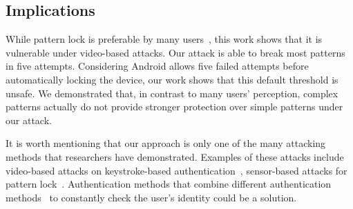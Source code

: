 

\subsection{Implications}
While pattern lock is preferable by many users~\cite{androidstudy}, this     work shows
that it is vulnerable under video-based attacks. Our attack
is able to break most patterns in five attempts. Considering Android
allows five failed attempts before automatically locking the device, our work
shows that this default threshold is unsafe. We demonstrated that, in contrast to many users'
perception, complex patterns actually do not provide stronger protection over simple patterns under our attack.

It is worth mentioning that our approach is only one of the many attacking
methods that researchers have demonstrated. Examples of these attacks include
video-based attacks on keystroke-based authentication~\cite{shukla2014beware,yue2014blind}, sensor-based attacks for
pattern lock~\cite{zhang2016privacy}. Authentication methods that combine different
authentication methods~\cite{de2012touch,stefan2012robustness,lingsecure,mannan2007using} to constantly check the user's identity could be
a solution. %



